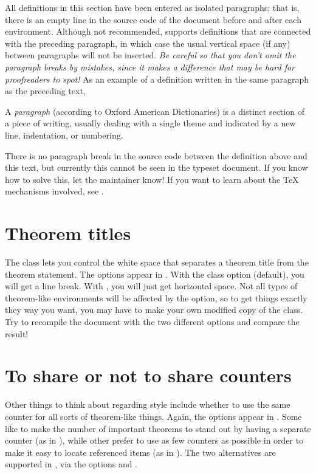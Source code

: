 All definitions in this section have been entered as isolated paragraphs; that is, there is an empty line in the source code of the document before and after each  environment.  Although not recommended, \rtthesis supports definitions that are connected with the preceding paragraph, in which case the usual vertical space (if any) between paragraphs will not be inserted.  \emph{Be careful so that you don't omit the paragraph breaks by mistakes, since it makes a difference that may be hard for proofreaders to spot!}  As an example of a definition written in the same paragraph as the preceding text,
\begin{definition}
  A \emph{paragraph} (according to Oxford American Dictionaries) is a distinct section of a piece of writing, usually dealing with a single theme and indicated by a new line, indentation, or numbering.
\end{definition}
There is no paragraph break in the source code between the definition above and this text, but currently this cannot be seen in the typeset document.  If you know how to solve this, let the \rtthesis maintainer know!  If you want to learn about the \TeX{} mechanisms involved, see \citet{RyckoJackowski93TeXIndentPar}.

\section{Theorem titles}
%
The class lets you control the white space that separates a theorem title from the theorem statement.  The options appear in .  With the class option  (default), you will get a line break.  With , you will just get horizontal space.  Not all types of theorem-like environments will be affected by the  option, so to get things exactly they way you want, you may have to make your own modified copy of the \rtthesis class.  Try to recompile the document with the two different options and compare the result!

\section{To share or not to share counters}\label{sec:rtthesis:sharecounter}
%
Other things to think about regarding style include whether to use the same counter for all sorts of theorem-like things.  Again, the options appear in .  Some like to make the number of important theorems to stand out by having a separate counter (as in \citet{Khalil02NonlinearSystemsBook}), while other prefer to use as few counters as possible in order to make it easy to locate referenced items (as in \citet{Rugh96LinearSystemsBook}).  The two alternatives are supported in \rtthesis, via the options  and .

